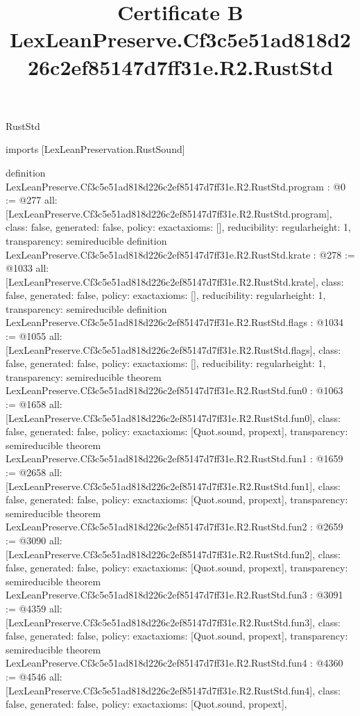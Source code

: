 \begin{lexlean}{RustStd}
\title{Certificate B LexLeanPreserve.Cf3c5e51ad818d226c2ef85147d7ff31e.R2.RustStd}
\begin{coremodule}
imports [LexLeanPreservation.RustSound]

definition LexLeanPreserve.Cf3c5e51ad818d226c2ef85147d7ff31e.R2.RustStd.program : @0 := @277 {
  all: [LexLeanPreserve.Cf3c5e51ad818d226c2ef85147d7ff31e.R2.RustStd.program],
  class: false,
  generated: false,
  policy: exact{axioms: []},
  reducibility: regular{height: 1},
  transparency: semireducible
}
definition LexLeanPreserve.Cf3c5e51ad818d226c2ef85147d7ff31e.R2.RustStd.krate : @278 := @1033 {
  all: [LexLeanPreserve.Cf3c5e51ad818d226c2ef85147d7ff31e.R2.RustStd.krate],
  class: false,
  generated: false,
  policy: exact{axioms: []},
  reducibility: regular{height: 1},
  transparency: semireducible
}
definition LexLeanPreserve.Cf3c5e51ad818d226c2ef85147d7ff31e.R2.RustStd.flags : @1034 := @1055 {
  all: [LexLeanPreserve.Cf3c5e51ad818d226c2ef85147d7ff31e.R2.RustStd.flags],
  class: false,
  generated: false,
  policy: exact{axioms: []},
  reducibility: regular{height: 1},
  transparency: semireducible
}
theorem LexLeanPreserve.Cf3c5e51ad818d226c2ef85147d7ff31e.R2.RustStd.fun0 : @1063 := @1658 {
  all: [LexLeanPreserve.Cf3c5e51ad818d226c2ef85147d7ff31e.R2.RustStd.fun0],
  class: false,
  generated: false,
  policy: exact{axioms: [Quot.sound, propext]},
  transparency: semireducible
}
theorem LexLeanPreserve.Cf3c5e51ad818d226c2ef85147d7ff31e.R2.RustStd.fun1 : @1659 := @2658 {
  all: [LexLeanPreserve.Cf3c5e51ad818d226c2ef85147d7ff31e.R2.RustStd.fun1],
  class: false,
  generated: false,
  policy: exact{axioms: [Quot.sound, propext]},
  transparency: semireducible
}
theorem LexLeanPreserve.Cf3c5e51ad818d226c2ef85147d7ff31e.R2.RustStd.fun2 : @2659 := @3090 {
  all: [LexLeanPreserve.Cf3c5e51ad818d226c2ef85147d7ff31e.R2.RustStd.fun2],
  class: false,
  generated: false,
  policy: exact{axioms: [Quot.sound, propext]},
  transparency: semireducible
}
theorem LexLeanPreserve.Cf3c5e51ad818d226c2ef85147d7ff31e.R2.RustStd.fun3 : @3091 := @4359 {
  all: [LexLeanPreserve.Cf3c5e51ad818d226c2ef85147d7ff31e.R2.RustStd.fun3],
  class: false,
  generated: false,
  policy: exact{axioms: [Quot.sound, propext]},
  transparency: semireducible
}
theorem LexLeanPreserve.Cf3c5e51ad818d226c2ef85147d7ff31e.R2.RustStd.fun4 : @4360 := @4546 {
  all: [LexLeanPreserve.Cf3c5e51ad818d226c2ef85147d7ff31e.R2.RustStd.fun4],
  class: false,
  generated: false,
  policy: exact{axioms: [Quot.sound, propext]},
}
\end{coremodule}
\end{lexlean}
